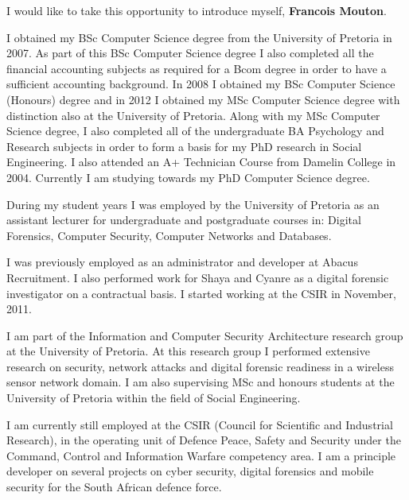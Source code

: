 \makelettertitle

I would like to take this opportunity to introduce myself, \textbf{Francois Mouton}.

I obtained my BSc Computer Science degree from the University of Pretoria in 2007. As part of this BSc Computer Science degree I also completed all the financial accounting subjects as required for a Bcom degree in order to have a sufficient accounting background. In 2008 I obtained my BSc Computer Science (Honours) degree and in 2012 I obtained my MSc Computer Science degree with distinction also at the University of Pretoria. Along with my MSc Computer Science degree, I also completed all of the undergraduate BA Psychology and Research subjects in order to form a basis for my PhD research in Social Engineering. I also attended an A+ Technician Course from Damelin College in 2004. Currently I am studying towards my PhD Computer Science degree.

During my student years I was employed by the University of Pretoria as an assistant lecturer for undergraduate and postgraduate courses in: Digital Forensics, Computer Security, Computer Networks and Databases.

I was previously employed as an administrator and developer at Abacus Recruitment. I also performed work for Shaya and Cyanre as a digital forensic investigator on a contractual basis. I started working at the CSIR in November, 2011. 

I am part of the Information and Computer Security Architecture research group at the University of Pretoria. At this research group I performed extensive research on security, network attacks and digital forensic readiness in a wireless sensor network domain. I am also supervising MSc and honours students at the University of Pretoria within the field of Social Engineering.

I am currently still employed at the CSIR (Council for Scientific and Industrial Research), in the operating unit of Defence Peace, Safety and Security under the Command, Control and Information Warfare competency area. I am a principle developer on several projects on cyber security, digital forensics and mobile security for the South African defence force.

\makeletterclosing

\clearpage

